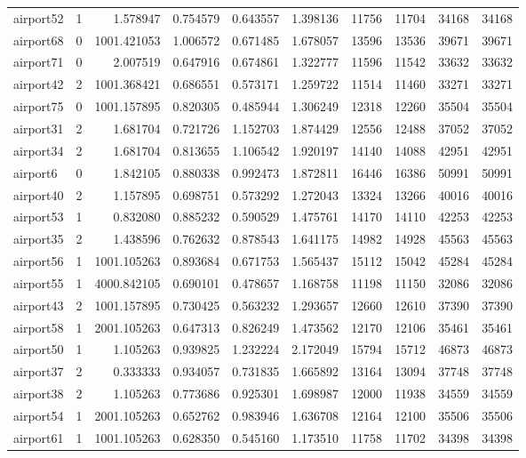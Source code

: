 \begin{longtable}{|l|r|r|r|r|r|r|r|r|r|}
airport52 & 1 & 1.578947 & 0.754579 & 0.643557 & 1.398136 & 11756 & 11704 & 34168 & 34168 \\
airport68 & 0 & 1001.421053 & 1.006572 & 0.671485 & 1.678057 & 13596 & 13536 & 39671 & 39671 \\
airport71 & 0 & 2.007519 & 0.647916 & 0.674861 & 1.322777 & 11596 & 11542 & 33632 & 33632 \\
airport42 & 2 & 1001.368421 & 0.686551 & 0.573171 & 1.259722 & 11514 & 11460 & 33271 & 33271 \\
airport75 & 0 & 1001.157895 & 0.820305 & 0.485944 & 1.306249 & 12318 & 12260 & 35504 & 35504 \\
airport31 & 2 & 1.681704 & 0.721726 & 1.152703 & 1.874429 & 12556 & 12488 & 37052 & 37052 \\
airport34 & 2 & 1.681704 & 0.813655 & 1.106542 & 1.920197 & 14140 & 14088 & 42951 & 42951 \\
airport6 & 0 & 1.842105 & 0.880338 & 0.992473 & 1.872811 & 16446 & 16386 & 50991 & 50991 \\
airport40 & 2 & 1.157895 & 0.698751 & 0.573292 & 1.272043 & 13324 & 13266 & 40016 & 40016 \\
airport53 & 1 & 0.832080 & 0.885232 & 0.590529 & 1.475761 & 14170 & 14110 & 42253 & 42253 \\
airport35 & 2 & 1.438596 & 0.762632 & 0.878543 & 1.641175 & 14982 & 14928 & 45563 & 45563 \\
airport56 & 1 & 1001.105263 & 0.893684 & 0.671753 & 1.565437 & 15112 & 15042 & 45284 & 45284 \\
airport55 & 1 & 4000.842105 & 0.690101 & 0.478657 & 1.168758 & 11198 & 11150 & 32086 & 32086 \\
airport43 & 2 & 1001.157895 & 0.730425 & 0.563232 & 1.293657 & 12660 & 12610 & 37390 & 37390 \\
airport58 & 1 & 2001.105263 & 0.647313 & 0.826249 & 1.473562 & 12170 & 12106 & 35461 & 35461 \\
airport50 & 1 & 1.105263 & 0.939825 & 1.232224 & 2.172049 & 15794 & 15712 & 46873 & 46873 \\
airport37 & 2 & 0.333333 & 0.934057 & 0.731835 & 1.665892 & 13164 & 13094 & 37748 & 37748 \\
airport38 & 2 & 1.105263 & 0.773686 & 0.925301 & 1.698987 & 12000 & 11938 & 34559 & 34559 \\
airport54 & 1 & 2001.105263 & 0.652762 & 0.983946 & 1.636708 & 12164 & 12100 & 35506 & 35506 \\
airport61 & 1 & 1001.105263 & 0.628350 & 0.545160 & 1.173510 & 11758 & 11702 & 34398 & 34398 \\

\end{longtable}
